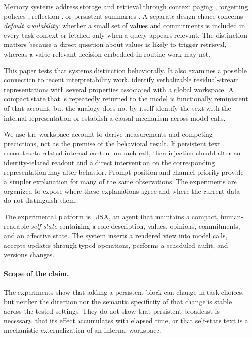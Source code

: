 \documentclass{article}
\begin{document}
Memory systems address storage and retrieval through context paging \citep{packer2023}, forgetting policies \citep{zhong2024memorybank}, reflection \citep{park2023}, or persistent summaries \citep{karimi2026engram}. A separate design choice concerns \emph{default availability}: whether a small set of values and commitments is included in every task context or fetched only when a query appears relevant. The distinction matters because a direct question about values is likely to trigger retrieval, whereas a value-relevant decision embedded in routine work may not.

This paper tests that systems distinction behaviorally. It also examines a possible connection to recent interpretability work. \citet{gurnee2026} identify verbalizable residual-stream representations with several properties associated with a global workspace. A compact state that is repeatedly returned to the model is functionally reminiscent of that account, but the analogy does not by itself identify the text with the internal representation or establish a causal mechanism across model calls.

We use the workspace account to derive measurements and competing predictions, not as the premise of the behavioral result. If persistent text reconstructs related internal content on each call, then injection should alter an identity-related readout and a direct intervention on the corresponding representation may alter behavior. Prompt position and channel priority provide a simpler explanation for many of the same observations. The experiments are organized to expose where these explanations agree and where the current data do not distinguish them.

The experimental platform is LISA, an agent that maintains a compact, human-readable \emph{self-state} containing a role description, values, opinions, commitments, and an affective state. The system inserts a rendered view into model calls, accepts updates through typed operations, performs a scheduled audit, and versions changes.

\paragraph{Scope of the claim.} The experiments show that adding a persistent block can change in-task choices, but neither the direction nor the semantic specificity of that change is stable across the tested settings. They do not show that persistent broadcast is necessary, that its effect accumulates with elapsed time, or that self-state text is a mechanistic externalization of an internal workspace.
\end{document}
